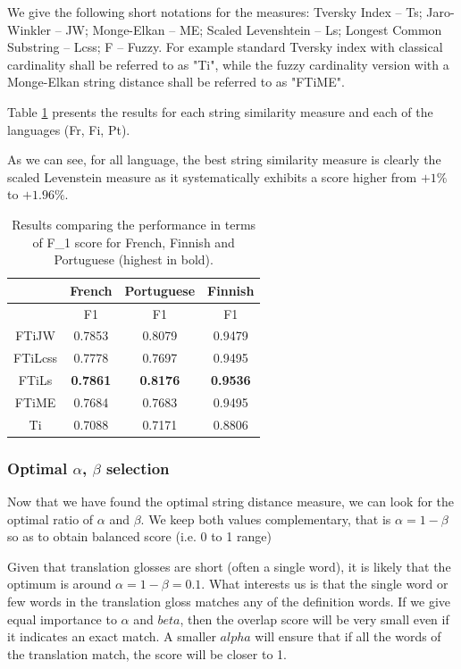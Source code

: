 \documentclass[10pt, a4paper]{article}
\begin{document}
We give the following short notations for the measures: Tversky Index -- Ts; Jaro-Winkler -- JW; Monge-Elkan -- ME; Scaled Levenshtein -- Ls; Longest Common Substring -- Lcss; F -- Fuzzy. For example standard Tversky index with classical cardinality shall be referred to as "Ti", while the fuzzy cardinality version with a Monge-Elkan string distance shall be referred to as "FTiME". 

Table \ref{tab:expe1} presents the results for each string similarity measure and each of the languages (Fr, Fi, Pt).

As we can see, for all language, the best string similarity measure is clearly the scaled Levenstein measure as it systematically exhibits a score higher from \(+1\%\) to \(+1.96\%\).

\begin{table}
{\centering \footnotesize
\begin{tabular}{|c|c|c|c|}
\hline &French&Portuguese&Finnish\\
\hline &F1&F1&F1\\
\hline FTiJW&0.7853&0.8079&0.9479\\
\hline FTiLcss&0.7778&0.7697&0.9495\\
\hline FTiLs&\textbf{0.7861}&\textbf{0.8176}&\textbf{0.9536}\\
\hline FTiME&0.7684&0.7683&0.9495\\
\hline Ti&0.7088&0.7171&0.8806\\
\hline 
\end{tabular} 
\caption{Results comparing the performance in terms of F\_1 score for French, Finnish and Portuguese (highest in bold).}
\label{tab:expe1}
}
\end{table}

\subsubsection{Optimal \(\alpha\), \(\beta\) selection}
Now that we have found the optimal string distance measure, we can look for the optimal ratio of \(\alpha\) and \(\beta\). We keep both values complementary, that is \(\alpha=1-\beta\) so as to obtain balanced score (i.e. 0 to 1 range)

Given that translation glosses are short (often a single word), it is likely that the optimum is around \(\alpha=1-\beta=0.1\). What interests us is that the single word or few words in the translation gloss matches any of the definition words. If we give equal importance to \(\alpha\) and \(beta\), then the overlap score will be very small even if it indicates an exact match. A smaller \(alpha\) will ensure that if all the words of the translation match, the score will be closer to 1.
\end{document}
